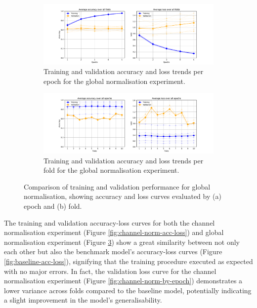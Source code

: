 \begin{figure}[htbp]
    \centering
    \begin{subfigure}{\textwidth}
        \centering
        \includegraphics[trim={3cm 0 3cm 0.8cm},clip,width=\textwidth]{img/ch4/global/global_by_epoch.pdf}
        \caption{Training and validation accuracy and loss trends per epoch for the global normalisation experiment.}
        \label{global-norm-by-epoch}
    \end{subfigure}
    
    \vspace{1cm}
    
    \begin{subfigure}{\textwidth}
        \centering
        \includegraphics[trim={3cm 0 3cm 0.8cm},clip,width=\textwidth]{img/ch4/channel/channel_by_fold.pdf}
        \caption{Training and validation accuracy and loss trends per fold for the global normalisation experiment.}
        \label{fig:global-norm-by-fold}
    \end{subfigure}
    \caption{Comparison of training and validation performance for global normalisation, showing accuracy and loss curves evaluated by (a) epoch and (b) fold.} 
    \label{fig:global-norm-acc-loss}
\end{figure}

The training and validation accuracy-loss curves for both the channel normalisation experiment (Figure \ref{fig:channel-norm-acc-loss}) and global normalisation experiment (Figure \ref{fig:global-norm-acc-loss}) show a great similarity between not only each other but also the benchmark model's accuracy-loss curves (Figure \ref{fig:baseline-acc-loss}), signifying that the training procedure executed as expected with no major errors. In fact, the validation loss curve for the channel normalisation experiment (Figure \ref{fig:channel-norm-by-epoch}) demonstrates a lower variance across folds compared to the baseline model, potentially indicating a slight improvement in the model's generalisability.

